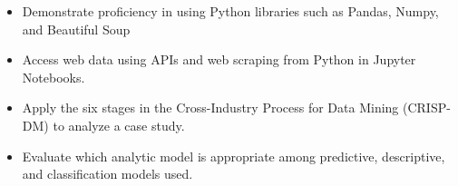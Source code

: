 \documentclass[11pt,a4paper,ragged2e]{altacv}
\begin{document}
\begin{paracol}{1}
\begin{itemize}
\item Demonstrate proficiency in using Python libraries such as Pandas, Numpy, and Beautiful Soup
\item Access web data using APIs and web scraping from Python in Jupyter Notebooks.
\end{itemize}
\tightdivider

\begin{itemize}
\item Apply the six stages in the Cross-Industry Process for Data Mining (CRISP-DM) to analyze a case study.
\item Evaluate which analytic model is appropriate among predictive, descriptive, and classification models used.
\end{itemize}
\medskip







\end{paracol}
\end{document}
